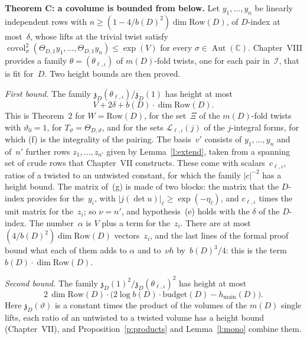 \documentclass[11pt,a4paper]{article}
\newcommand{\m}[1]{\mbox{$#1$}}        %
\newcommand{\subhead}[1]{\par\addvspace{9pt plus 2pt}\Needspace{4\baselineskip}\noindent\textbf{#1}\enspace\ignorespaces}
\theoremstyle{plainx}
\theoremstyle{uprightx}
\newcommand{\AutC}{\operatorname{Aut}(\mathbb{C})}
\newcommand{\IX}{\mathcal{I}}
\newcommand{\Ls}{\mathcal{L}}
\newcommand{\abs}[1]{\lvert #1\rvert}
\newcommand{\Row}{\mathrm{Row}}
\newcommand{\budget}{\mathrm{budget}}
\newcommand{\hmain}{h_{\mathrm{main}}}
\newcommand{\covol}{\operatorname{covol}}
\begin{document}
\subhead{Theorem C: a covolume is bounded from below.} Let \m{y_1,\dots,y_n} be linearly independent rows with
\m{n\ge(1-4/b(D)^2)\dim\Row(D)}, of $D$-index at most~$\delta$, whose lifts at the trivial twist satisfy
\m{\covol_\sigma^2(\Theta_{D,1}y_1,\dots,\Theta_{D,1}y_n)\le\exp(V)} for every $\sigma\in\AutC$. Chapter~VIII provides
a family $\theta=(\theta_{\ell,\iota})$ of $m(D)$-fold twists, one for each pair in~$\IX$, that is fit for~$D$. Two
height bounds are then proved.

\emph{First bound.} The family \m{\mathfrak{z}_D(\theta_{\ell,\iota})/\mathfrak{z}_D(1)} has height at most
\[V+2\delta+b(D)\cdot\dim\Row(D).\]
This is Theorem~2 for \m{W=\Row(D)}, for the set~$\Xi$ of the $m(D)$-fold twists with
\m{\vartheta_0=1}, for \m{T_\vartheta=\Theta_{D,\vartheta}}, and for the sets $\Ls_{\ell,\iota}(j)$ of the
$j$-integral forms, for which (f) is the integrality of the pairing. The basis~$v'$ consists of \m{y_1,\dots,y_n}
and of~$n'$ further rows \m{z_1,\dots,z_{n'}} given by Lemma~\ref{l:extend}, taken from a spanning set of crude
rows that Chapter~VII constructs. These come with scalars~$c_{\ell,\iota}$, ratios of a twisted to an untwisted constant, for which the family
$\abs{c}^{-2}$ has a height bound. The matrix of~(g) is made of two blocks: the matrix that the $D$-index
provides for the~$y_i$, with \m{\abs{j(\det u)}_\ell\ge\exp(-\eta_\ell)}, and $c_{\ell,\iota}$ times the unit matrix
for the~$z_i$; so \m{\nu=n'}, and hypothesis~(e) holds with the $\delta$ of the $D$-index. The number~$\alpha$ is $V$
plus a term for the~$z_i$. There are at most \m{(4/b(D)^2)\dim\Row(D)} vectors~$z_i$, and the last lines of the formal
proof bound what each of them adds to $\alpha$ and to~$\nu h$ by~$b(D)^3/4$: this is the term \m{b(D)\cdot\dim\Row(D)}.

\emph{Second bound.} The family \m{\mathfrak{z}_D(1)^2/\mathfrak{z}_D(\theta_{\ell,\iota})^2} has height at most
\[2\,\dim\Row(D)\cdot\bigl(2\log b(D)\cdot\budget(D)-\hmain(D)\bigr).\]
Here $\mathfrak{z}_D(\vartheta)$ is a constant times the
product of the volumes of the $m(D)$ single lifts, each ratio of an untwisted to a twisted volume has a height
bound (Chapter~VII), and Proposition~\ref{p:products} and Lemma~\ref{l:mono} combine them.
\end{document}
